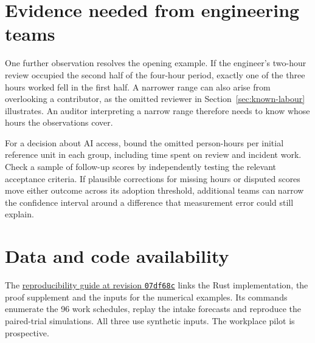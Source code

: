 \documentclass[11pt,a4paper]{amsart}
\begin{document}


\section{Evidence needed from engineering teams}
\label{sec:limits}

One further observation resolves the opening example. If the engineer's two-hour review occupied the second half of the four-hour period, exactly one of the three hours worked fell in the first half. A narrower range can also arise from overlooking a contributor, as the omitted reviewer in Section~\ref{sec:known-labour} illustrates. An auditor interpreting a narrow range therefore needs to know whose hours the observations cover.

For a decision about AI access, bound the omitted person-hours per initial reference unit in each group, including time spent on review and incident work. Check a sample of follow-up scores by independently testing the relevant acceptance criteria. If plausible corrections for missing hours or disputed scores move either outcome across its adoption threshold, additional teams can narrow the confidence interval around a difference that measurement error could still explain.

\section*{Data and code availability}
The \href{https://github.com/emmett08/engineering-work-observatory/tree/07df68c8990b9cdb7c7cd2af133918bf60f1e916/paper}{reproducibility guide at revision \texttt{07df68c}} links the Rust implementation, the proof supplement and the inputs for the numerical examples. Its commands enumerate the 96 work schedules, replay the intake forecasts and reproduce the paired-trial simulations. All three use synthetic inputs. The workplace pilot is prospective.

\appendix




\end{document}
